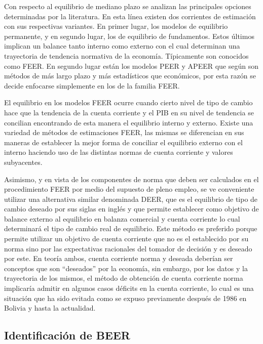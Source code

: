\documentclass[12pt,letterpaper]{article}
\begin{document}
Con respecto al equilibrio de mediano plazo se analizan las principales opciones determinadas por la literatura. En esta línea existen dos corrientes de estimación con sus respectivas variantes. En primer lugar, los modelos de equilibrio permanente, y en segundo lugar, los de equilibrio de fundamentos. Estos últimos implican un balance tanto interno como externo con el cual determinan una trayectoria de tendencia normativa de la economía. Típicamente son conocidos como FEER. En segundo lugar están los modelos PEER y APEER que según \cite{driver2005concepts} son métodos de más largo plazo y más estadísticos que económicos, por esta razón se decide enfocarse simplemente en los de la familia FEER.

El equilibrio en los modelos FEER ocurre cuando cierto nivel de tipo de cambio hace que la tendencia de la cuenta corriente y el PIB en su nivel de tendencia se concilian encontrando de esta manera el equilibrio interno y externo. Existe una variedad de métodos de estimaciones FEER, las mismas se diferencian en sus maneras de establecer la mejor forma de conciliar el equilibrio externo con el interno haciendo uso de las distintas normas de cuenta corriente y valores subyacentes.

Asimismo, y en vista de los componentes de norma que deben ser calculados en el procedimiento FEER por medio del supuesto de pleno empleo, se ve conveniente utilizar una alternativa similar denominada DEER, que es el equilibrio de tipo de cambio deseado por sus siglas en inglés y que permite establecer como objetivo de balance externo al equilibrio en balanza comercial y cuenta corriente lo cual determinará el tipo de cambio real de equilibrio. Este método es preferido porque permite utilizar un objetivo de cuenta corriente que no es el establecido por su norma sino por las expectativas racionales del tomador de decisión y es deseado por este. En teoría ambos, cuenta corriente norma y deseada deberían ser conceptos que son ``deseados'' por la economía, sin embargo, por los datos y la trayectoria de los mismos, el método de obtención de cuenta corriente norma implicaría admitir en algunos casos déficits en la cuenta corriente, lo cual es una situación que ha sido evitada como se expuso previamente después de 1986 en Bolivia y hasta la actualidad.


\subsection{Identificación de BEER}
\end{document}
